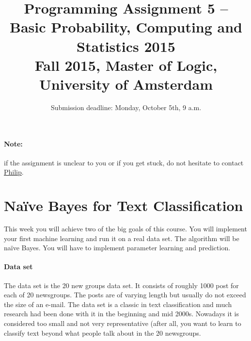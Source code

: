 \documentclass[11pt, leqno, a4paper]{article}
\title{Programming Assignment 5 -- Basic Probability, Computing and Statistics 2015 \\[2mm]
\large{Fall 2015, Master of Logic, University of Amsterdam}}
\author{}
\date{Submission deadline: Monday, October 5th, 9 a.m.}
\begin{document}
\maketitle

\paragraph{Note:} if the assignment is unclear to you or if you get stuck, do not hesitate to contact \href{mailto:P.Schulz@uva.nl}{Philip}.

\section{Na\"ive Bayes for Text Classification}

This week you will achieve two of the big goals of this course. You will implement your first machine learning 
and run it on a real data set. The algorithm will be na\"ive Bayes. You will have to implement parameter
learning and prediction. 

\paragraph{Data set} The data set is the 20 new groups data set. It consists of roughly 1000 post for each
of 20 newsgroups. The posts are of varying length but usually do not exceed the size of an e-mail. The
data set is a classic in text classification and much research had been done with it in the beginning and
mid 2000s. Nowadays it is considered too small and not very representative (after all, you want to learn
to classify text beyond what people talk about in the 20 newsgroups.
\end{document}
